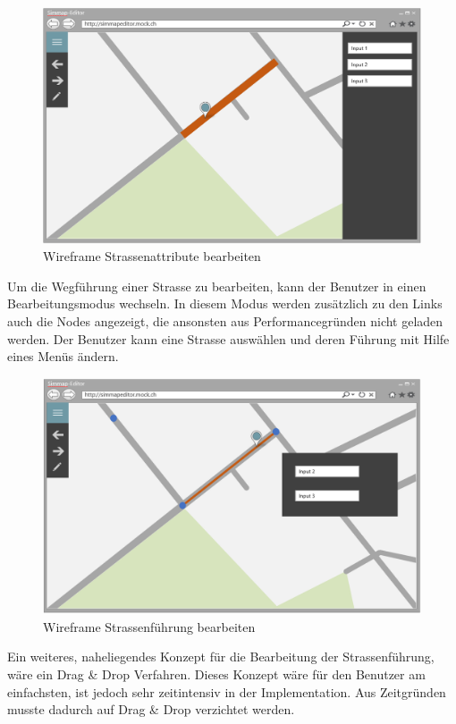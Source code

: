 \begin{figure}[H]
\centering
\includegraphics[height=7cm]{images/KonzeptEditStreet.PNG}
\caption{Wireframe Strassenattribute bearbeiten}
\label{fig:concepteditStreet}
\end{figure}
\newpage
\noindent
Um die Wegführung einer Strasse zu bearbeiten, kann der Benutzer in einen Bearbeitungsmodus wechseln. In diesem Modus werden zusätzlich zu den Links auch die Nodes angezeigt, die ansonsten aus Performancegründen nicht geladen werden. Der Benutzer kann eine Strasse auswählen und deren Führung mit Hilfe eines Menüs ändern.
\begin{figure}[H]
\centering
\includegraphics[height=7cm]{images/KonzeptChangeStreet.PNG}
\caption{Wireframe Strassenführung bearbeiten}
\label{fig:concepteditStreet}
\end{figure}
\noindent
Ein weiteres, naheliegendes Konzept für die Bearbeitung der Strassenführung, wäre ein Drag \& Drop Verfahren. Dieses Konzept wäre für den Benutzer am einfachsten, ist jedoch sehr zeitintensiv in der Implementation. Aus Zeitgründen musste dadurch auf Drag \& Drop verzichtet werden.
